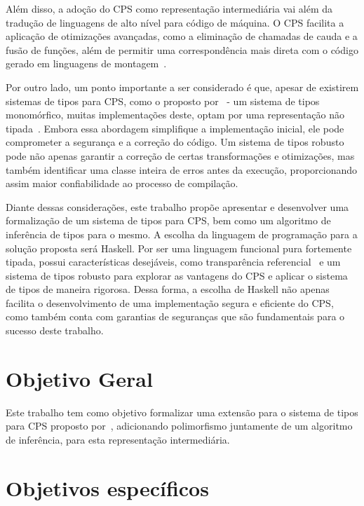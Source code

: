 Além disso, a adoção do CPS como representação intermediária vai além da tradução de linguagens de alto nível para código de máquina.
O CPS facilita a aplicação de otimizações avançadas, como a eliminação de chamadas de cauda e a fusão de funções, além de permitir uma correspondência mais direta com o código gerado em linguagens de montagem~\cite{flanagan1993essence}.

Por outro lado, um ponto importante a ser considerado é que, apesar de existirem sistemas de tipos para CPS, como o proposto por~ - um sistema de tipos monomórfico, muitas implementações deste, optam por uma representação não tipada~\cite{morrisett1999systemF}.
Embora essa abordagem simplifique a implementação inicial, ele pode comprometer a segurança e a correção do código.
Um sistema de tipos robusto pode não apenas garantir a correção de certas transformações e otimizações, mas também identificar uma classe inteira de erros antes da execução, proporcionando assim maior confiabilidade ao processo de compilação.

Diante dessas considerações, este trabalho propõe apresentar e desenvolver uma formalização de um sistema de tipos para CPS, bem como um algoritmo de inferência de tipos para o mesmo.
A escolha da linguagem de programação para a solução proposta será Haskell.
Por ser uma linguagem funcional pura fortemente tipada, possui características desejáveis, como transparência referencial~\cite{sondergaard1990transparency} e um sistema de tipos robusto para explorar as vantagens do CPS e aplicar o sistema de tipos de maneira rigorosa.
Dessa forma, a escolha de Haskell não apenas facilita o desenvolvimento de uma implementação segura e eficiente do CPS, como também conta com garantias de seguranças que são fundamentais para o sucesso deste trabalho.

\section{Objetivo Geral}\label{sec:objetivo-geral}

Este trabalho tem como objetivo formalizar uma extensão para o sistema de tipos para CPS proposto por~, adicionando polimorfismo juntamente de um algoritmo de inferência, para esta representação intermediária.

\section{Objetivos específicos}\label{sec:objetivos-especificos}

